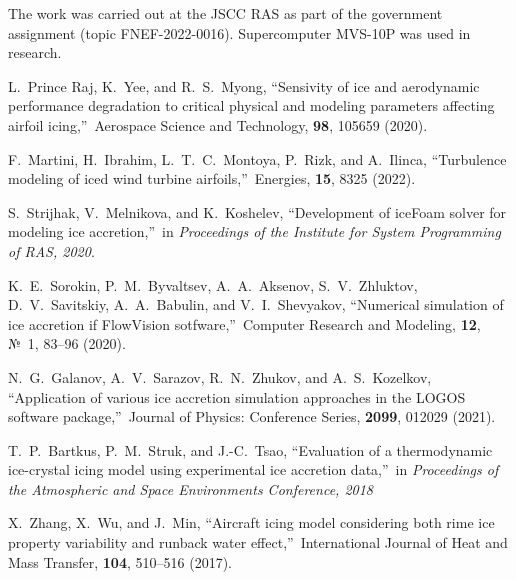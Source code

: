 \documentclass[
11pt,%
tightenlines,%
twoside,%
onecolumn,%
nofloats,%
nobibnotes,%
nofootinbib,%
superscriptaddress,%
noshowpacs,%
centertags]%
{revtex4-2}
\begin{document}
\begin{acknowledgments}
The work was carried out at the JSCC RAS as part of the government assignment (topic FNEF-2022-0016). Supercomputer MVS-10P was used in research.
\end{acknowledgments}


\begin{thebibliography}{99}


L.~Prince Raj, K.~Yee, and R.~S.~Myong, \textquotedblleft Sensivity of ice and aerodynamic performance degradation to critical physical and modeling parameters affecting airfoil icing,\textquotedblright \ Aerospace Science and Technology, {\bf 98}, 105659 (2020).

F.~Martini, H.~Ibrahim, L.~T.~C.~Montoya, P.~Rizk, and A.~Ilinca, \textquotedblleft Turbulence modeling of iced wind turbine airfoils,\textquotedblright \ Energies, {\bf 15}, 8325 (2022).

S.~Strijhak, V.~Melnikova, and K.~Koshelev, \textquotedblleft Development of iceFoam solver for modeling ice accretion,\textquotedblright \ in \textit{Proceedings of the Institute for System Programming of RAS, 2020}.

K.~E.~Sorokin, P.~M.~Byvaltsev, A.~A.~Aksenov, S.~V.~Zhluktov, D.~V.~Savitskiy, A.~A.~Babulin, and V.~I.~Shevyakov, \textquotedblleft Numerical simulation of ice accretion if FlowVision sotfware,\textquotedblright \ Computer Research and Modeling, {\bf 12}, №~1, 83--96 (2020).

N.~G.~Galanov, A.~V.~Sarazov, R.~N.~Zhukov, and A.~S.~Kozelkov, \textquotedblleft Application of various ice accretion simulation approaches in the LOGOS software package,\textquotedblright \ Journal of Physics: Conference Series, {\bf 2099}, 012029 (2021).

T.~P.~Bartkus, P.~M.~Struk, and J.-C.~Tsao, \textquotedblleft Evaluation of a thermodynamic ice-crystal icing model using experimental ice accretion data,\textquotedblright \ in \textit{Proceedings of the Atmospheric and Space Environments Conference, 2018}

X.~Zhang, X.~Wu, and J.~Min, \textquotedblleft Aircraft icing model considering both rime ice property variability and runback water effect,\textquotedblright \ International Journal of Heat and Mass Transfer, {\bf 104}, 510--516 (2017).


\end{thebibliography}
\end{document}
